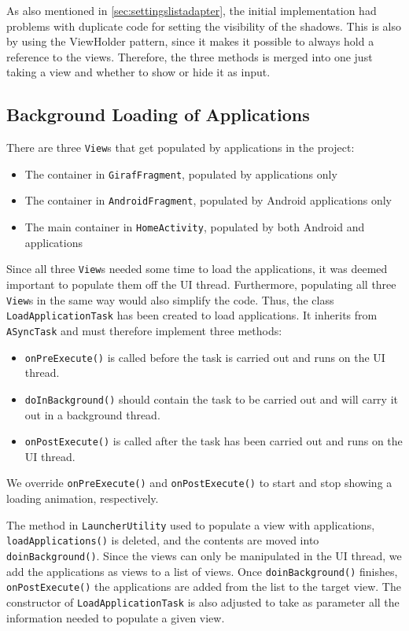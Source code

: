 As also mentioned in \cref{sec:settingslistadapter}, the initial implementation had problems with duplicate code for setting the visibility of the shadows.
This is also by using the ViewHolder pattern, since it makes it possible to always hold a reference to the views. 
Therefore, the three methods is merged into one just taking a view and whether to show or hide it as input.

\subsection{Background Loading of Applications}\label{sec:sprint4:dev:loadapplicationtask}
There are three \lstinline!View!s that get populated by applications in the \launcher project:

\begin{itemize}
\item The container in \lstinline!GirafFragment!, populated by \giraf applications only
\item The container in \lstinline!AndroidFragment!, populated by Android applications only
\item The main container in \lstinline!HomeActivity!, populated by both Android and \giraf applications
\end{itemize}

Since all three \lstinline!View!s needed some time to load the applications, it was deemed important to populate them off the UI thread.
Furthermore, populating all three \lstinline!View!s in the same way would also simplify the code.
Thus, the class \lstinline!LoadApplicationTask! has been created to load applications. 
It inherits from \lstinline!ASyncTask! and must therefore implement three methods:

\begin{itemize}
\item \lstinline!onPreExecute()! is called before the task is carried out and runs on the UI thread.
\item \lstinline!doInBackground()! should contain the task to be carried out and will carry it out in a background thread.
\item \lstinline!onPostExecute()! is called after the task has been carried out and runs on the UI thread.
\end{itemize}

We override \lstinline!onPreExecute()! and \lstinline!onPostExecute()! to start and stop showing a loading animation, respectively.

The method in \lstinline!LauncherUtility! used to populate a view with applications, \lstinline!loadApplications()! is deleted, and the contents are moved into \lstinline!doinBackground()!.
Since the views can only be manipulated in the UI thread, we add the applications as views to a list of views.
Once \lstinline!doinBackground()! finishes, \lstinline!onPostExecute()! the applications are added from the list to the target view. 
The constructor of \lstinline!LoadApplicationTask! is also adjusted to take as parameter all the information needed to populate a given view.

